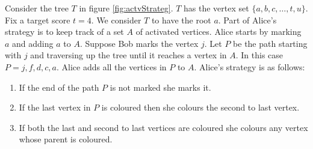 Consider the tree $T$ in figure \ref{fig:actvStrateg}. $T$ has the vertex set $\{a,b,c,\dots,t,u\}$. Fix a target score $t=4$. We consider $T$ to have the root $a$. Part of Alice's strategy is to keep track of a set $A$ of activated vertices. Alice starts by marking $a$ and adding $a$ to $A$. Suppose Bob marks the vertex $j$. 
Let $P$ be the path starting with $j$ and traversing up the tree until it reaches a vertex in $A$. In this case $P= j, f, d, c, a$. Alice adds all the vertices in $P$ to $A$. Alice's strategy is as follows:

\begin{enumerate}
    \item If the end of the path $P$ is not marked she marks it. 
    \item If the last vertex in $P$ is coloured then she colours the second to last vertex. 
    \item If both the last and second to last vertices are coloured she colours any vertex whose parent is coloured. 
\end{enumerate}

